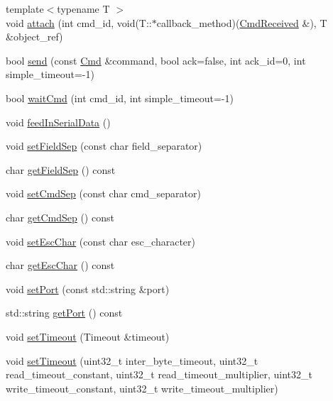 \begin{DoxyCompactItemize}
\item 
{\footnotesize template$<$typename T $>$ }\\void \hyperlink{classcmd_1_1_cmd_messenger_a8f50f00a66e6d40ed5ee2234b424e9a9}{attach} (int cmd\+\_\+id, void(T\+::$\ast$callback\+\_\+method)(\hyperlink{classcmd_1_1_cmd_received}{Cmd\+Received} \&), T \&object\+\_\+ref)
\item 
bool \hyperlink{classcmd_1_1_cmd_messenger_a5ea6815a9c6dad49350396839527e25d}{send} (const \hyperlink{namespacecmd_af9b58ca395c80edd1335e21d1b9f4c99}{Cmd} \&command, bool ack=false, int ack\+\_\+id=0, int simple\+\_\+timeout=-\/1)
\item 
bool \hyperlink{classcmd_1_1_cmd_messenger_a40c20df2763d3af8e59a7c135a82e121}{wait\+Cmd} (int cmd\+\_\+id, int simple\+\_\+timeout=-\/1)
\item 
void \hyperlink{classcmd_1_1_cmd_messenger_a3257cf2b159a2b3d8754b701865c743d}{feed\+In\+Serial\+Data} ()
\item 
void \hyperlink{classcmd_1_1_cmd_messenger_af83fbed5873f5e517a0432438dd7c873}{set\+Field\+Sep} (const char field\+\_\+separator)
\item 
char \hyperlink{classcmd_1_1_cmd_messenger_a84895ecc82e2302891b119887944a308}{get\+Field\+Sep} () const 
\item 
void \hyperlink{classcmd_1_1_cmd_messenger_afebb6b63ae64c661b680597ef29bc879}{set\+Cmd\+Sep} (const char cmd\+\_\+separator)
\item 
char \hyperlink{classcmd_1_1_cmd_messenger_acfa9dda9411bc8943973abd5f5f6156f}{get\+Cmd\+Sep} () const 
\item 
void \hyperlink{classcmd_1_1_cmd_messenger_ada69819065773ffc3c4923517321d6e5}{set\+Esc\+Char} (const char esc\+\_\+character)
\item 
char \hyperlink{classcmd_1_1_cmd_messenger_adf36d1a1b153793d9bf33f14b26167a5}{get\+Esc\+Char} () const 
\item 
void \hyperlink{classcmd_1_1_cmd_messenger_ab95dce49fc8845498c71bae25987a923}{set\+Port} (const std\+::string \&port)
\item 
std\+::string \hyperlink{classcmd_1_1_cmd_messenger_ab2ebaaabdfeb83decbc868b556a1ea0b}{get\+Port} () const 
\item 
void \hyperlink{classcmd_1_1_cmd_messenger_a0ccea65cba7a807bdf4c476f8db9289a}{set\+Timeout} (Timeout \&timeout)
\item 
void \hyperlink{classcmd_1_1_cmd_messenger_a0d628c1961f8d2b96fa7081961f6a0c1}{set\+Timeout} (uint32\+\_\+t inter\+\_\+byte\+\_\+timeout, uint32\+\_\+t read\+\_\+timeout\+\_\+constant, uint32\+\_\+t read\+\_\+timeout\+\_\+multiplier, uint32\+\_\+t write\+\_\+timeout\+\_\+constant, uint32\+\_\+t write\+\_\+timeout\+\_\+multiplier)

\end{DoxyCompactItemize}
